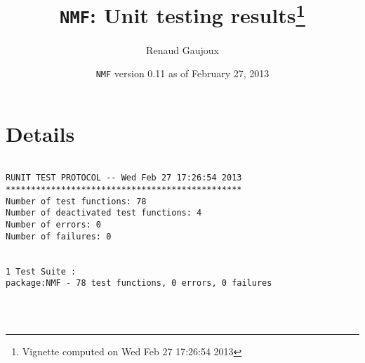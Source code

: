 \documentclass[10pt]{article}
\author{Renaud Gaujoux}
\title{\texttt{NMF}: Unit testing results\footnote{Vignette computed  on Wed Feb 27 17:26:54 2013}}
\date{\texttt{NMF} version 0.11 as of February 27, 2013}
\begin{document}
\maketitle

\section{Details}
\begin{verbatim}

RUNIT TEST PROTOCOL -- Wed Feb 27 17:26:54 2013 
*********************************************** 
Number of test functions: 78 
Number of deactivated test functions: 4 
Number of errors: 0 
Number of failures: 0 

 
1 Test Suite : 
package:NMF - 78 test functions, 0 errors, 0 failures




\end{verbatim}
\end{document}
